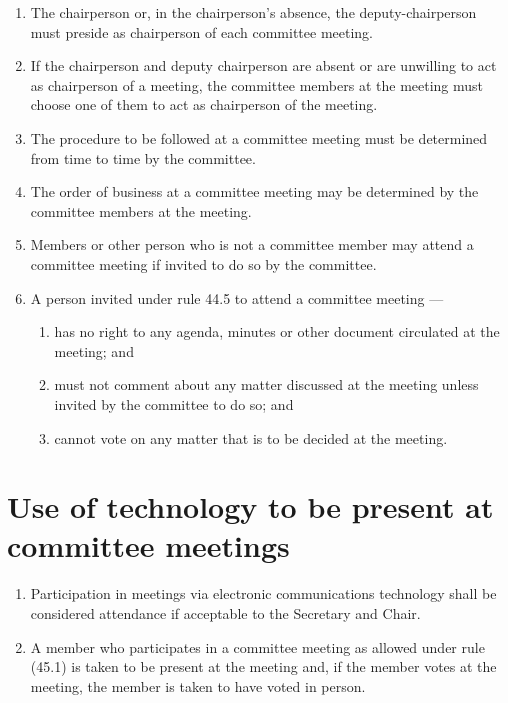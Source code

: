 \begin{enumerate}

\item The chairperson or, in the chairperson's absence, the deputy-chairperson must preside as chairperson of each committee meeting.
\item If the chairperson and deputy chairperson are absent or are unwilling to act as chairperson of a meeting, the committee members at the meeting must choose one of them to act as chairperson of the meeting.
\item The procedure to be followed at a committee meeting must be determined from time to time by the committee.
\item The order of business at a committee meeting may be determined by the committee members at the meeting.
\item Members or other person who is not a committee member may attend a committee meeting if invited to do so by the committee.
\item A person invited under rule 44.5 to attend a committee meeting ---

  \begin{enumerate}
  
  \item has no right to any agenda, minutes or other document circulated at the meeting; and
  \item must not comment about any matter discussed at the meeting unless invited by the committee to do so; and
  \item cannot vote on any matter that is to be decided at the meeting.
  \end{enumerate}
\end{enumerate}

\hypertarget{use-of-technology-to-be-present-at-committee-meetings}{%
\section{Use of technology to be present at committee meetings}\label{use-of-technology-to-be-present-at-committee-meetings}}

\begin{enumerate}

\item Participation in meetings via electronic communications technology shall be considered attendance if acceptable to the Secretary and Chair.
\item A member who participates in a committee meeting as allowed under rule (45.1) is taken to be present at the meeting and, if the member votes at the meeting, the member is taken to have voted in person.
\end{enumerate}

